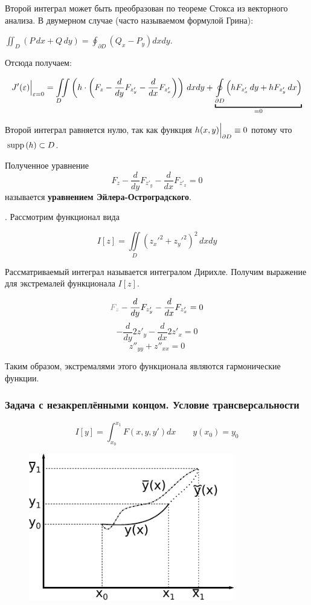 \documentclass[12pt]{article}
\begin{document}
			Второй интеграл может быть преобразован по теореме Стокса из векторного анализа. В двумерном случае (часто называемом формулой Грина):

			$\iint_{D} (P\,dx + Q\,dy) = \oint_{\partial D} (Q_x - P_y) dx dy$.

			Отсюда получаем:

			$$
				J'(\varepsilon)\lims{\varepsilon = 0}{} = 
				\underset{D\hspace{10pt}}{\iint} \left( h\cdot\left(F_z - \frac{d}{dy}F_{z'_y} - \frac{d}{dx}F_{z'_x}\right) \right) \,dxdy
				+ \underbracket{\underset{\partial D}{\oint} \left(hF_{z'_x}\,dy + hF_{z'_y}\,dx \right)}_{=0}
			$$

			Второй интеграл равняется нулю, так как функция $h(x, y)\Big|_{\partial D}^{} \equiv 0$ потому что $\,\text{supp}\,(h) \subset D$.

			Полученное уравнение
			$$F_z - \frac{d}{dy}F_{z'_y} - \frac{d}{dx}F_{z'_x} = 0$$
			называется \textbf{уравнением Эйлера-Остроградского}.

			. Рассмотрим функционал вида 
	
				$$I[z] = \iint\limits_D (z_x'^2 + z_y'^2)^2 \,dxdy$$
	
				Рассматриваемый интеграл называется интегралом Дирихле. Получим выражение для экстремалей
				функционала $I[z]$.
	
				$$\off{F_z} - \frac{d}{dy} F_{z'_y} - \frac{d}{dx} F_{z'_x} = 0$$
				$$-\frac{d}{dy} 2z'_y - \frac{d}{dx} 2z'_x = 0$$
				$$z''_{yy} + z''_{xx} = 0$$
	
				Таким образом, экстремалями этого функционала являются гармонические функции.

		\subsubsection{Задача с незакреплёнными концом. Условие трансверсальности}

			$$I[y] = \int_{x_0}^{x_1} F(x, y, y')dx \qquad y(x_0) = y_0$$
	
			\begin{figure}
				\includegraphics[width=0.8\textwidth]{./../Graphics/Lectures-12-unknowntask.pdf}
			\end{figure}
	
\end{document}
